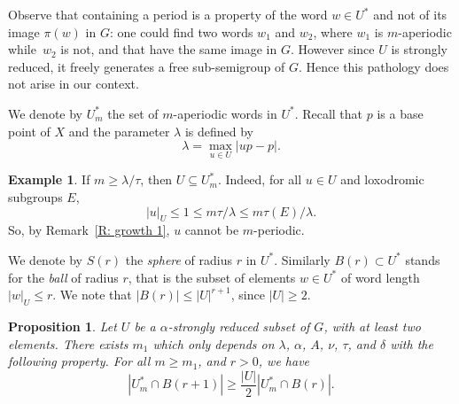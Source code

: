 \documentclass[JEP,XML,SOM,Unicode, NoEqCountersInSection,published]{cedram}
\theoremstyle{plain}
\newtheorem{prop}[thm]{Proposition}
\theoremstyle{definition}
\newtheorem{ex}[thm]{Example}
\begin{document}
Observe that containing a period is a property of the word $w \in U^*$ and not of its image $\pi(w)$ in $G$:
one could find two words $w_1$ and $w_2$, where $w_1$ is $m$-aperiodic while~$w_2$ is not, and that have the same image in $G$.
However since $U$ is strongly reduced, it freely generates a free sub-semigroup of $G$.
Hence this pathology does not arise in our context.

We denote by $U^*_m$ the set of $m$-aperiodic words in $U^*$.
Recall that $p$ is a base point of $X$ and the parameter $\lambda$ is defined by
\begin{equation*}
\lambda = \max_{u \in U} | up - p|.
\end{equation*}

\begin{ex}\label{E: proper power} If $m \geq \lambda/\tau$, then $U\subseteq U^*_m$.
Indeed, for all $u\in U$ and loxodromic subgroups $E$,
\[
|u|_U \leq 1 \leq m\tau/\lambda \leq m \tau(E)/\lambda.
\]
So, by Remark~\ref{R: growth 1}, $u$ cannot be $m$-periodic.
\end{ex}

We denote by $S(r)$ the \emph{sphere} of radius $r$ in $U^*$.
Similarly $B(r) \subset U^*$ stands for the \emph{ball} of radius $r$, that is the subset of elements $w\in U^*$ of word length $|w|_U \leqslant r$.
We note that $|B(r)|\leqslant |U|^{r+1}$, since $|U| \geq 2$.

\begin{prop}\label{P: aperiodic counting}
Let $U$ be a $\alpha$-strongly reduced subset of $G$, with at least two elements.
There exists $m_1$ which only depends on $\lambda$, $\alpha$, $A$, $\nu$, $\tau$, and $\delta$ with the following property.
For all $m \geq m_1$, and $r>0$, we have
\[
|U^*_m \cap B(r+1)| \geqslant \frac{|U|}2 |U^*_m \cap B(r)|.
\]
\end{prop}
\end{document}
